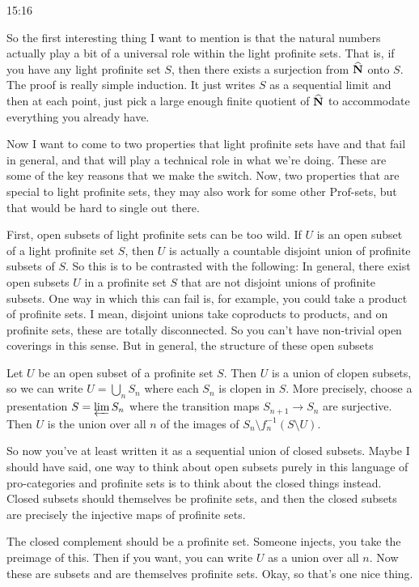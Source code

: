 \begin{unfinished}{15:16}
\begin{example}
\begin{remark}
So the first interesting thing I want to mention is that the natural numbers actually play a bit of a universal role within the light profinite sets. That is, if you have any light profinite set $S$, then there exists a surjection from $\widehat{\mathbf N}$ onto $S$. The proof is really simple induction. It just writes $S$ as a sequential limit and then at each point, just pick a large enough finite quotient of $\widehat{\mathbf N}$ to accommodate everything you already have.

Now I want to come to two properties that light profinite sets have and that fail in general, and that will play a technical role in what we're doing. These are some of the key reasons that we make the switch. Now, two properties that are special to light profinite sets, they may also work for some other $\text{Prof}$-sets, but that would be hard to single out there.

First, open subsets of light profinite sets can be too wild. If $U$ is an open subset of a light profinite set $S$, then $U$ is actually a countable disjoint union of profinite subsets of $S$. So this is to be contrasted with the following: In general, there exist open subsets $U$ in a profinite set $S$ that are not disjoint unions of profinite subsets. One way in which this can fail is, for example, you could take a product of profinite sets. I mean, disjoint unions take coproducts to products, and on profinite sets, these are totally disconnected. So you can't have non-trivial open coverings in this sense. But in general, the structure of these open subsets

Let $U$ be an open subset of a profinite set $S$. Then $U$ is a union of clopen subsets, so we can write $U = \bigcup_{n} S_n$ where each $S_n$ is clopen in $S$. More precisely, choose a presentation $S = \varprojlim S_n$ where the transition maps $S_{n+1} \to S_n$ are surjective. Then $U$ is the union over all $n$ of the images of $S_n \setminus f_n^{-1}(S \setminus U)$.

So now you've at least written it as a sequential union of closed subsets. Maybe I should have said, one way to think about open subsets purely in this language of pro-categories and profinite sets is to think about the closed things instead. Closed subsets should themselves be profinite sets, and then the closed subsets are precisely the injective maps of profinite sets.

The closed complement should be a profinite set. Someone injects, you take the preimage of this. Then if you want, you can write $U$ as a union over all $n$. Now these are subsets and are themselves profinite sets. Okay, so that's one nice thing.


\end{remark}
\end{example}
\end{unfinished}

